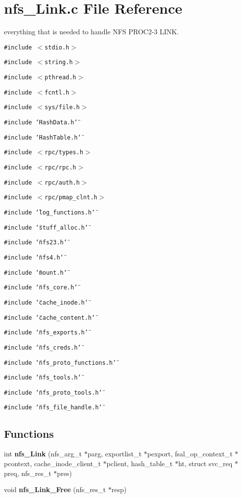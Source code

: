 \section{nfs\_\-Link.c File Reference}
\label{nfs__Link_8c}
everything that is needed to handle NFS PROC2-3 LINK.  


{\tt \#include $<$stdio.h$>$}\par
{\tt \#include $<$string.h$>$}\par
{\tt \#include $<$pthread.h$>$}\par
{\tt \#include $<$fcntl.h$>$}\par
{\tt \#include $<$sys/file.h$>$}\par
{\tt \#include \char`\"{}HashData.h\char`\"{}}\par
{\tt \#include \char`\"{}HashTable.h\char`\"{}}\par
{\tt \#include $<$rpc/types.h$>$}\par
{\tt \#include $<$rpc/rpc.h$>$}\par
{\tt \#include $<$rpc/auth.h$>$}\par
{\tt \#include $<$rpc/pmap\_\-clnt.h$>$}\par
{\tt \#include \char`\"{}log\_\-functions.h\char`\"{}}\par
{\tt \#include \char`\"{}stuff\_\-alloc.h\char`\"{}}\par
{\tt \#include \char`\"{}nfs23.h\char`\"{}}\par
{\tt \#include \char`\"{}nfs4.h\char`\"{}}\par
{\tt \#include \char`\"{}mount.h\char`\"{}}\par
{\tt \#include \char`\"{}nfs\_\-core.h\char`\"{}}\par
{\tt \#include \char`\"{}cache\_\-inode.h\char`\"{}}\par
{\tt \#include \char`\"{}cache\_\-content.h\char`\"{}}\par
{\tt \#include \char`\"{}nfs\_\-exports.h\char`\"{}}\par
{\tt \#include \char`\"{}nfs\_\-creds.h\char`\"{}}\par
{\tt \#include \char`\"{}nfs\_\-proto\_\-functions.h\char`\"{}}\par
{\tt \#include \char`\"{}nfs\_\-tools.h\char`\"{}}\par
{\tt \#include \char`\"{}nfs\_\-proto\_\-tools.h\char`\"{}}\par
{\tt \#include \char`\"{}nfs\_\-file\_\-handle.h\char`\"{}}\par
\subsection*{Functions}
\begin{CompactItemize}
\item 
int {\bf nfs\_\-Link} (nfs\_\-arg\_\-t $\ast$parg, exportlist\_\-t $\ast$pexport, fsal\_\-op\_\-context\_\-t $\ast$pcontext, cache\_\-inode\_\-client\_\-t $\ast$pclient, hash\_\-table\_\-t $\ast$ht, struct svc\_\-req $\ast$preq, nfs\_\-res\_\-t $\ast$pres)
\item 
void {\bf nfs\_\-Link\_\-Free} (nfs\_\-res\_\-t $\ast$resp)
\end{CompactItemize}


